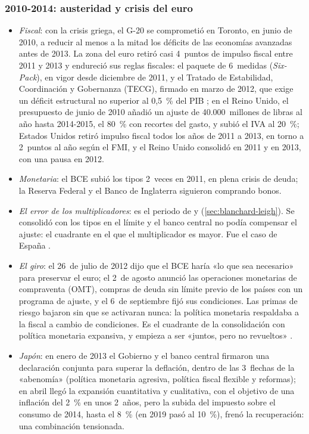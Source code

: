 \documentclass[11pt]{article}
\begin{document}
\subsubsection{2010-2014: austeridad y crisis del euro}\label{sec:fase-austeridad}

\begin{itemize}
\item \emph{Fiscal}: con la crisis griega, el G-20 se comprometió en Toronto, en junio de 2010, a reducir al menos a la mitad los déficits de las economías avanzadas antes de 2013\nocite{G202010Toronto}. La zona del euro retiró casi 4~puntos de impulso fiscal entre 2011 y 2013\nocite{FMI2026FMdatos} y endureció sus reglas fiscales: el paquete de 6~medidas (\emph{Six-Pack}), en vigor desde diciembre de 2011, y el Tratado de Estabilidad, Coordinación y Gobernanza (TECG), firmado en marzo de 2012, que exige un déficit estructural no superior al 0,5~\% del PIB ; en el Reino Unido, el presupuesto de junio de 2010 añadió un ajuste de 40.000~millones de libras al año hasta 2014-2015, el 80~\% con recortes del gasto, y subió el IVA al 20~\%\nocite{HMT2010Budget}; Estados Unidos retiró impulso fiscal todos los años de 2011 a 2013, en torno a 2~puntos al año según el FMI, y el Reino Unido consolidó en 2011 y en 2013, con una pausa en 2012\nocite{FMI2026FMdatos,OCDE2026EOsaldos}.
\item \emph{Monetaria}: el BCE subió los tipos 2~veces en 2011, en plena crisis de deuda\nocite{BCE2026Tipos}; la Reserva Federal y el Banco de Inglaterra siguieron comprando bonos.
\item \emph{El error de los multiplicadores}: es el periodo de  y  (\ref{sec:blanchard-leigh}). Se consolidó con los tipos en el límite y el banco central no podía compensar el ajuste: el cuadrante en el que el multiplicador es mayor. Fue el caso de España  .
\item \emph{El giro}: el 26~de julio de 2012  dijo que el BCE haría «lo que sea necesario» para preservar el euro\nocite{Draghi2012Speech}; el 2~de agosto anunció las operaciones monetarias de compraventa (OMT), compras de deuda sin límite previo de los países con un programa de ajuste, y el 6~de septiembre fijó sus condiciones\nocite{BCE2012OMTanuncio,BCE2012OMT}. Las primas de riesgo bajaron sin que se activaran nunca: la política monetaria respaldaba a la fiscal a cambio de condiciones. Es el cuadrante de la consolidación con política monetaria expansiva, y empieza a ser «juntos, pero no revueltos» .
\item \emph{Japón}: en enero de 2013 el Gobierno y el banco central firmaron una declaración conjunta para superar la deflación, dentro de las 3~flechas de la «abenomía» (política monetaria agresiva, política fiscal flexible y reformas); en abril llegó la expansión cuantitativa y cualitativa, con el objetivo de una inflación del 2~\% en unos 2~años\nocite{BoJ2013QQE}, pero la subida del impuesto sobre el consumo de 2014, hasta el 8~\% (en 2019 pasó al 10~\%)\nocite{NTA2026Consumo}, frenó la recuperación: una combinación tensionada.
\end{itemize}
\end{document}

